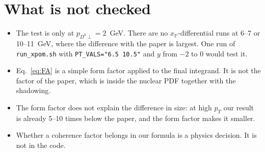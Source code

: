 \documentclass[11pt]{article}
\begin{document}
\section{What is not checked}

\begin{itemize}
  \item The test is only at $p_{D^0\perp}=2$~GeV. There are no
    $x_\mathbb{P}$-differential runs at 6--7 or 10--11~GeV, where the
    difference with the paper is largest. One run of \texttt{run\_xpom.sh}
    with \texttt{PT\_VALS="6.5 10.5"} and $y$ from $-2$ to $0$ would test it.
  \item Eq.~\eqref{eq:FA} is a simple form factor applied to the final
    integrand. It is not the factor of the paper, which is inside the nuclear
    PDF together with the shadowing.
  \item The form factor does not explain the difference in size: at high
    $p_T$ our result is already 5--10 times below the paper, and the form
    factor makes it smaller.
  \item Whether a coherence factor belongs in our formula is a physics
    decision. It is not in the code.
\end{itemize}
\end{document}

